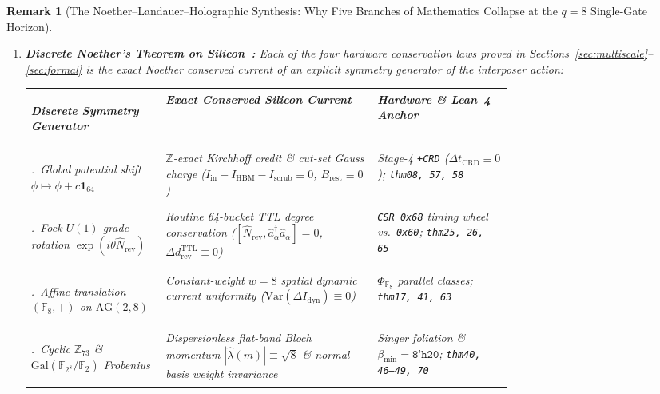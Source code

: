 \documentclass[11pt,letterpaper]{article}
\renewcommand{\arraystretch}{1.22}
\theoremstyle{spectralthm}
\newtheorem{remark}[theorem]{Remark}
\begin{document}
\begin{remark}[The Noether--Landauer--Holographic Synthesis: Why Five Branches of Mathematics Collapse at the $q=8$ Single-Gate Horizon]
\begin{enumerate}[leftmargin=1.4em,label=\textup{(\roman*)},topsep=2.5pt,itemsep=2pt]
  \item \textbf{Discrete Noether's Theorem on Silicon~\cite{noether1918invariante}:} Each of the four hardware conservation laws proved in Sections~\ref{sec:multiscale}--\ref{sec:formal} is the exact Noether conserved current of an explicit symmetry generator of the interposer action:
  \begin{center}
  \scriptsize
  \setlength{\tabcolsep}{4.5pt}
  \renewcommand{\arraystretch}{1.18}
  \begin{tabularx}{0.98\linewidth}{@{}>{\bfseries\raggedright\arraybackslash}p{0.28\linewidth} >{\raggedright\arraybackslash}p{0.44\linewidth} X@{}}
  \toprule
  Discrete Symmetry Generator & Exact Conserved Silicon Current & Hardware \& Lean~4 Anchor \\
  \midrule
  1.\ Global potential shift $\phi \mapsto \phi + c\mathbf{1}_{64}$ & $\mathbb{Z}$-exact Kirchhoff credit \& cut-set Gauss charge ($I_{\mathrm{in}} - I_{\mathrm{HBM}} - I_{\mathrm{scrub}} \equiv 0$, $B_{\mathrm{rest}}\equiv 0$) & Stage-4 \texttt{+CRD} ($\Delta t_{\mathrm{CRD}}\equiv 0$); \texttt{thm08, 57, 58} \\
  2.\ Fock $U(1)$ grade rotation $\exp(i\theta\hat{N}_{\mathrm{rev}})$ & Routine 64-bucket TTL degree conservation ($[\hat{N}_{\mathrm{rev}}, \hat{a}_\alpha^\dagger\hat{a}_\alpha]=0$, $\Delta d_{\mathrm{rev}}^{\mathrm{TTL}} \equiv 0$) & \texttt{CSR 0x68} timing wheel vs.\ \texttt{0x60}; \texttt{thm25, 26, 65} \\
  3.\ Affine translation $(\mathbb{F}_8,+)$ on $\mathrm{AG}(2,8)$ & Constant-weight $w = 8$ spatial dynamic current uniformity ($\mathrm{Var}(\Delta I_{\mathrm{dyn}}) \equiv 0$) & $\Phi_{\mathbb{F}_8}$ parallel classes; \texttt{thm17, 41, 63} \\
  4.\ Cyclic $\mathbb{Z}_{73}$ \& $\mathrm{Gal}(\mathbb{F}_{2^8}/\mathbb{F}_2)$ Frobenius & Dispersionless flat-band Bloch momentum $|\hat{\lambda}(m)|\equiv\sqrt{8}$ \& normal-basis weight invariance & Singer foliation \& $\beta_{\min}=\texttt{8'h20}$; \texttt{thm40, 46--49, 70} \\
  \bottomrule
  \end{tabularx}
  \end{center}

\end{enumerate}
\end{remark}
\end{document}
